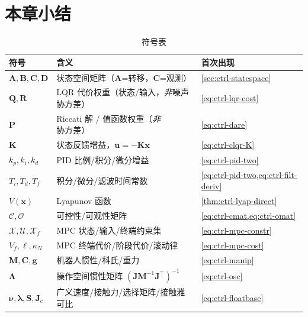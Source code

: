 \section*{本章小结}

\begin{table}[H]\centering\small
\caption{符号表}
\label{tab:ctrl-symbols}
\begin{tabular}{lll}
\toprule
符号 & 含义 & 首次出现 \\
\midrule
$\mathbf{A},\mathbf{B},\mathbf{C},\mathbf{D}$ & 状态空间矩阵（$\mathbf{A}$=转移，$\mathbf{C}$=观测） & \cref{sec:ctrl-statespace} \\
$\mathbf{Q},\mathbf{R}$ & LQR 代价权重（状态/输入，\emph{非}噪声协方差） & \cref{eq:ctrl-lqr-cost} \\
$\mathbf{P}$ & Riccati 解 / 值函数权重（\emph{非}协方差） & \cref{eq:ctrl-dare} \\
$\mathbf{K}$ & 状态反馈增益，$\mathbf{u}=-\mathbf{K}\mathbf{x}$ & \cref{eq:ctrl-clqr-K} \\
$k_p,k_i,k_d$ & PID 比例/积分/微分增益 & \cref{eq:ctrl-pid-two} \\
$T_i,T_d,T_f$ & 积分/微分/滤波时间常数 & \cref{eq:ctrl-pid-two,eq:ctrl-filt-deriv} \\
$V(\mathbf{x})$ & Lyapunov 函数 & \cref{thm:ctrl-lyap-direct} \\
$\mathcal{C},\mathcal{O}$ & 可控性/可观性矩阵 & \cref{eq:ctrl-cmat,eq:ctrl-omat} \\
$\mathcal{X},\mathcal{U},\mathcal{X}_f$ & MPC 状态/输入/终端约束集 & \cref{eq:ctrl-mpc-constr} \\
$V_f,\ell,\kappa_N$ & MPC 终端代价/阶段代价/滚动律 & \cref{eq:ctrl-mpc-cost} \\
$\mathbf{M},\mathbf{C},\mathbf{g}$ & 机器人惯性/科氏/重力 & \cref{eq:ctrl-manip} \\
$\boldsymbol{\Lambda}$ & 操作空间惯性矩阵 $(\mathbf{J}\mathbf{M}^{-1}\mathbf{J}^\top)^{-1}$ & \cref{eq:ctrl-osc} \\
$\boldsymbol{\nu},\boldsymbol{\lambda},\mathbf{S},\mathbf{J}_c$ & 广义速度/接触力/选择矩阵/接触雅可比 & \cref{eq:ctrl-floatbase} \\
\bottomrule
\end{tabular}
\end{table}

